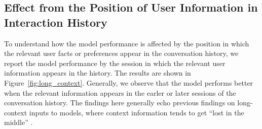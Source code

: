 \subsection{Effect from the Position of User Information in Interaction History}
\label{ssec:long-context}
To understand how the model performance is affected by the position in which the relevant user facts or preferences appear in the conversation history, we report the model performance by the session in which the relevant user information appears in the history. The results are shown in Figure~\ref{fig:long_context}. Generally, we observe that the model performs better when the relevant information appears in the earler or later sessions of the conversation history. The findings here generally echo previous findings on long-context inputs to models, where context information tends to get ``lost in the middle'' \citep{liu2024lost, wu2024longmemeval}.     

    



